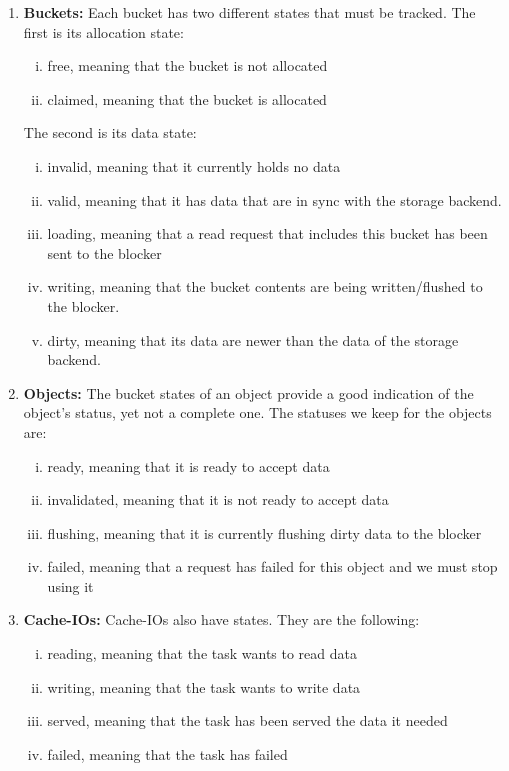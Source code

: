 \begin{enumerate}
\item \textbf{Buckets:} Each bucket has two different states that must be 
	tracked. The first is its allocation state:
	\begin{enumerate}[i)]
		\item free, meaning that the bucket is not allocated
		\item claimed, meaning that the bucket is allocated
	\end{enumerate}
	The second is its data state:
	\begin{enumerate}[i)]
		\item invalid, meaning that it currently holds no data
		\item valid, meaning that it has data that are in sync with the
			storage backend.
		\item loading, meaning that a read request that includes this 
			bucket has been sent to the blocker
		\item writing, meaning that the bucket contents are being 
			written/flushed to the blocker.
		\item dirty, meaning that its data are newer than the data of 
			the storage backend.
	\end{enumerate}
\item \textbf{Objects:} The bucket states of an object provide a good 
	indication of the object's status, yet not a complete one. The statuses 
	we keep for the objects are:
	\begin{enumerate}[i)]
		\item ready, meaning that it is ready to accept data
		\item invalidated, meaning that it is not ready to accept data
		\item flushing, meaning that it is currently flushing dirty 
			data to the blocker
		\item failed, meaning that a request has failed for this object 
			and we must stop using it
	\end{enumerate}
\item \textbf{Cache-IOs:} Cache-IOs also have states. They are the following:
	\begin{enumerate}[i)]
		\item reading, meaning that the task wants to read data
		\item writing, meaning that the task wants to write data
		\item served, meaning that the task has been served the data it 
			needed
		\item failed, meaning that the task has failed
	\end{enumerate}
\end{enumerate}

